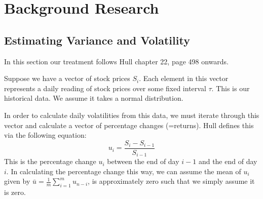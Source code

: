 \documentclass[../Dissertation.tex]{subfiles}
\begin{document}
\section{Background Research}
\label{section:background}

\subsection{Estimating Variance and Volatility}

In this section our treatment follows Hull \cite{Hull:2012} chapter 22, page 498 onwards.

Suppose we have a vector of stock prices ${S_i}$.
Each element in this vector represents a daily reading of stock prices over some fixed interval $\tau$.
This is our historical data.
We assume it takes a normal distribution.

In order to calculate daily volatilities from this data, we must iterate through this vector and calculate a vector of percentage changes (=returns).
Hull \cite{Hull:2012} defines this via the following equation:
\begin{equation}
    \label{eqn:returns}
    {u_i} = \frac{{S_i}-{S_{i-1}}}{S_{i-1}}
\end{equation}
This is the percentage change ${u_i}$ between the end of day ${i-1}$ and the end of day ${i}$.
In calculating the percentage change this way, we can assume the mean of ${u_i}$ given by $\bar{u}={\frac{1}{m}\sum_{i=1}^m{u_{n-i}}}$, is approximately zero such that we simply assume it is zero.
\end{document}
